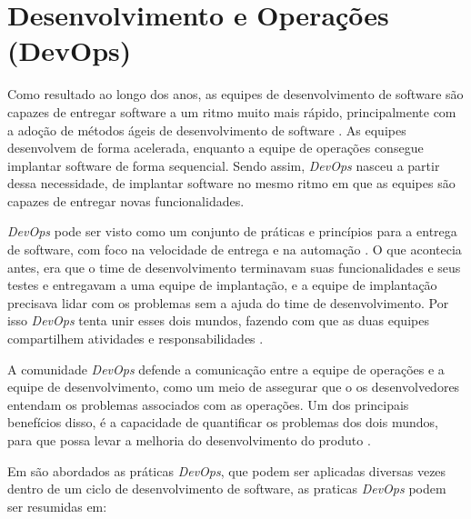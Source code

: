 \section{Desenvolvimento e Operações (DevOps)}
\label{subsec:DevOps}
Como resultado ao longo dos anos, as equipes de desenvolvimento de software
são capazes de entregar software a um ritmo muito mais rápido, principalmente com a adoção
de métodos ágeis de desenvolvimento de software \cite{7173368}. As 
equipes desenvolvem de forma acelerada, enquanto a equipe de operações consegue 
implantar software de forma sequencial. Sendo assim, \textit{DevOps}
nasceu a partir dessa necessidade, de implantar software no mesmo ritmo em que
as equipes são capazes de entregar novas funcionalidades.

\textit{DevOps} pode ser visto como um conjunto de práticas e princípios para a 
entrega de software, com foco na velocidade de entrega e na automação \cite{7173368}. 
O que acontecia antes, era que o time de desenvolvimento terminavam suas funcionalidades e seus testes e
entregavam a uma equipe de implantação, e a equipe de implantação precisava
lidar com os problemas sem a ajuda do time de desenvolvimento. Por isso \textit{DevOps} 
tenta unir esses dois mundos, fazendo com que as duas equipes compartilhem atividades
 e responsabilidades \cite{6265084}.

A comunidade \textit{DevOps} defende a comunicação
entre a equipe de operações e a equipe de desenvolvimento, como um meio de assegurar
que o os desenvolvedores entendam os problemas associados com as operações. Um dos
principais benefícios disso, é a capacidade de quantificar os problemas dos dois mundos,
para que possa levar a melhoria do desenvolvimento do produto \cite{httermann2012DevOps}.

Em  são abordados as práticas \textit{DevOps}, que podem ser 
aplicadas diversas vezes dentro de um ciclo de desenvolvimento de software, as 
praticas \textit{DevOps} podem ser resumidas em:

